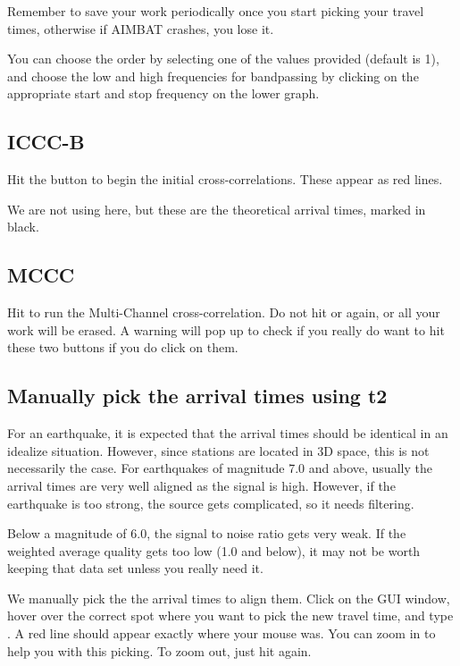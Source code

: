 \documentclass[letterpaper,10pt,english]{sphinxmanual}
\begin{document}
Remember to save your work periodically once you start picking your travel times, otherwise if AIMBAT crashes, you lose it.

You can choose the order by selecting one of the values provided (default is 1), and choose the low and high frequencies for bandpassing by clicking on the appropriate start and stop frequency on the lower graph.


\subsection{ICCC-B}
\label{docfiles/PickingTravelTimes:iccc-b}
Hit the  button to begin the initial cross-correlations. These appear as red lines.

We are not using  here, but these are the theoretical arrival times, marked in black.


\subsection{MCCC}
\label{docfiles/PickingTravelTimes:mccc}
Hit  to run the Multi-Channel cross-correlation. Do not hit  or  again, or all your work will be erased. A warning will pop up to check if you really do want to hit these two buttons if you do click on them.


\subsection{Manually pick the arrival times using t2}
\label{docfiles/PickingTravelTimes:manually-pick-the-arrival-times-using-t2}
For an earthquake, it is expected that the arrival times should be identical in an idealize situation. However, since stations are located in 3D space, this is not necessarily the case. For earthquakes of magnitude 7.0 and above, usually the arrival times are very well aligned as the signal is high. However, if the earthquake is too strong, the source gets complicated, so it needs filtering.

Below a magnitude of 6.0, the signal to noise ratio gets very weak. If the weighted average quality gets too low (1.0 and below), it may not be worth keeping that data set unless you really need it.

We manually pick the the arrival times to align them. Click on the GUI window, hover over the correct spot where you want to pick the new travel time, and type . A red line should appear exactly where your mouse was. You can zoom in to help you with this picking. To zoom out, just hit  again.
\end{document}

